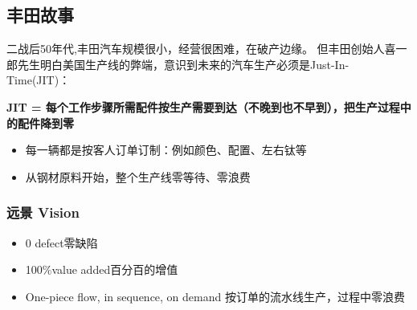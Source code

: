 

\hypertarget{ux4e30ux7530ux6545ux4e8b}{%
\subsection{丰田故事}\label{ux4e30ux7530ux6545ux4e8b}}

二战后50年代,丰田汽车规模很小，经营很困难，在破产边缘。
但丰田创始人喜一郎先生明白美国生产线的弊端，意识到未来的汽车生产必须是Just-In-Time(JIT)：

\begin{description}
\tightlist
\item[]
\textbf{JIT =
每个工作步骤所需配件按生产需要到达（不晚到也不早到），把生产过程中的配件降到零}
\end{description}

\begin{itemize}
\tightlist
\item
  每一辆都是按客人订单订制：例如颜色、配置、左右钛等
\item
  从钢材原料开始，整个生产线零等待、零浪费
\end{itemize}

\hypertarget{ux8fdcux666f-vision}{%
\subsubsection{远景 Vision}\label{ux8fdcux666f-vision}}

\begin{itemize}
\tightlist
\item
  0 defect零缺陷
\item
  100\%value added百分百的增值
\item
  One-piece flow, in sequence, on demand
  按订单的流水线生产，过程中零浪费
\end{itemize}

